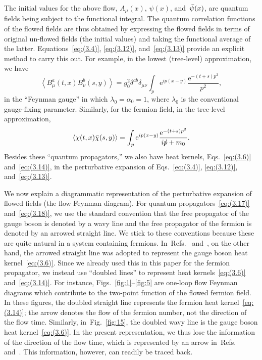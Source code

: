 The initial values for the above flow, $A_\mu(x)$, $\psi(x)$,
and~$\Bar{\psi}(x)$, are quantum fields being subject to the functional
integral. The quantum correlation functions of the flowed fields are thus
obtained by expressing the flowed fields in terms of original un-flowed fields
(the initial values) and taking the functional average of the latter.
Equations~\eqref{eq:(3.4)}, \eqref{eq:(3.12)}, and~\eqref{eq:(3.13)} provide an
explicit method to carry this out. For example, in the lowest (tree-level)
approximation, we have
\begin{equation}
   \left\langle B_\mu^a(t,x)B_\nu^b(s,y)\right\rangle
   =g_0^2\delta^{ab}\delta_{\mu\nu}\int_p\mathrm{e}^{ip(x-y)}\frac{\mathrm{e}^{-(t+s)p^2}}{p^2},
\label{eq:(3.17)}
\end{equation}
in the ``Feynman gauge'' in which $\lambda_0=\alpha_0=1$, where $\lambda_0$ is
the conventional gauge-fixing parameter. Similarly, for the fermion field, in
the tree-level approximation,
\begin{equation}
   \left\langle\chi(t,x)\Bar{\chi}(s,y)\right\rangle
   =\int_p\mathrm{e}^{ip(x-y)}\frac{\mathrm{e}^{-(t+s)p^2}}{i\Slash{p}+m_0}.
\label{eq:(3.18)}
\end{equation}
Besides these ``quantum propagators,'' we also have heat kernels,
Eqs.~\eqref{eq:(3.6)} and~\eqref{eq:(3.14)}, in the perturbative expansion of
Eqs.~\eqref{eq:(3.4)}, \eqref{eq:(3.12)}, and~\eqref{eq:(3.13)}.

We now explain a diagrammatic representation of the perturbative expansion of
flowed fields (the flow Feynman diagram). For quantum
propagators~\eqref{eq:(3.17)} and~\eqref{eq:(3.18)}, we use the standard
convention that the free propagator of the gauge boson is denoted by a wavy
line and the free propagator of the fermion is denoted by an arrowed straight
line. We stick to these conventions because these are quite natural in a system
containing fermions. In~Refs.~\cite{Suzuki:2013gza} and~\cite{Luscher:2011bx},
on the other hand, the arrowed straight line was adopted to represent the gauge
boson heat kernel~\eqref{eq:(3.6)}. Since we already used this in this paper
for the fermion propagator, we instead use ``doubled lines'' to represent heat
kernels~\eqref{eq:(3.6)} and~\eqref{eq:(3.14)}. For instance,
Figs.~\ref{fig:1}--\ref{fig:5} are one-loop flow Feynman diagrams which
contribute to the two-point function of the flowed fermion field. In these
figures, the doubled straight line represents the fermion heat
kernel~\eqref{eq:(3.14)}; the arrow denotes the flow of the fermion number, not
the direction of the flow time. Similarly, in~Fig.~\ref{fig:15}, the doubled
wavy line is the gauge boson heat kernel~\eqref{eq:(3.6)}. In the present
representation, we thus lose the information of the direction of the flow time,
which is represented by an arrow in~Refs.~\cite{Suzuki:2013gza}
and~\cite{Luscher:2011bx}. This information, however, can readily be traced
back.

